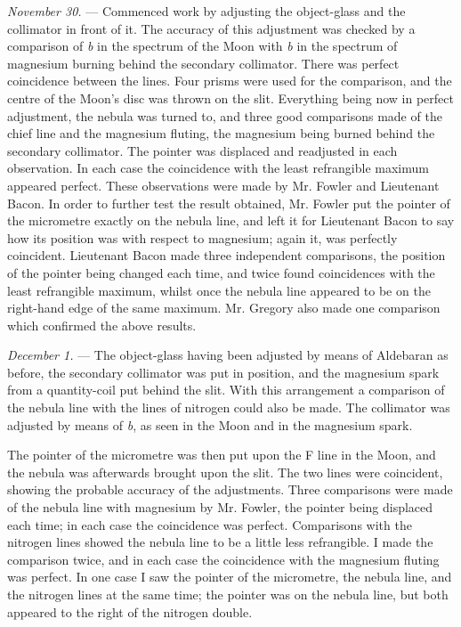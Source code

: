 \documentclass[a4paper, 12pt, oneside, polutonikogreek, english]{article}
\begin{document}
\emph{November 30.} --- Commenced work by adjusting the object-glass and the collimator in front of it. The accuracy of this adjustment was checked by a comparison of \emph{b} in the spectrum of the Moon with \emph{b} in the spectrum of magnesium burning behind the secondary collimator. There was perfect coincidence between the lines. Four prisms were used for the comparison, and the centre of the Moon's disc was thrown on the slit. Everything being now in perfect adjustment, the nebula was turned to, and three good comparisons made of the chief line and the magnesium fluting, the magnesium being burned behind the secondary collimator. The pointer was displaced and readjusted in each observation. In each case the coincidence with the least refrangible maximum appeared perfect. These observations were made by Mr. Fowler and Lieutenant Bacon. In order to further test the result obtained, Mr. Fowler put the pointer of the micrometre exactly on the nebula line, and left it for Lieutenant Bacon to say how its position was with respect to magnesium; again it, was perfectly coincident. Lieutenant Bacon made three independent comparisons, the position of the pointer being changed each time, and twice found coincidences with the least refrangible maximum, whilst once the nebula line appeared to be on the right-hand edge of the same maximum. Mr. Gregory also made one comparison which confirmed the above results.

\emph{December 1.} --- The object-glass having been adjusted by means of Aldebaran as before, the secondary collimator was put in position, and the magnesium spark from a quantity-coil put behind the slit. With this arrangement a comparison of the nebula line with the lines of nitrogen could also be made. The collimator was adjusted by means of \emph{b}, as seen in the Moon and in the magnesium spark.

The pointer of the micrometre was then put upon the F line in the Moon, and the nebula was afterwards brought upon the slit. The two lines were coincident, showing the probable accuracy of the adjustments. Three comparisons were made of the nebula line with magnesium by Mr. Fowler, the pointer being displaced each time; in each case the coincidence was perfect. Comparisons with the nitrogen lines showed the nebula line to be a little less refrangible. I made the comparison twice, and in each case the coincidence with the magnesium fluting was perfect. In one case I saw the pointer of the micrometre, the nebula line, and the nitrogen lines at the same time; the pointer was on the nebula line, but both appeared to the right of the nitrogen double.
\end{document}
